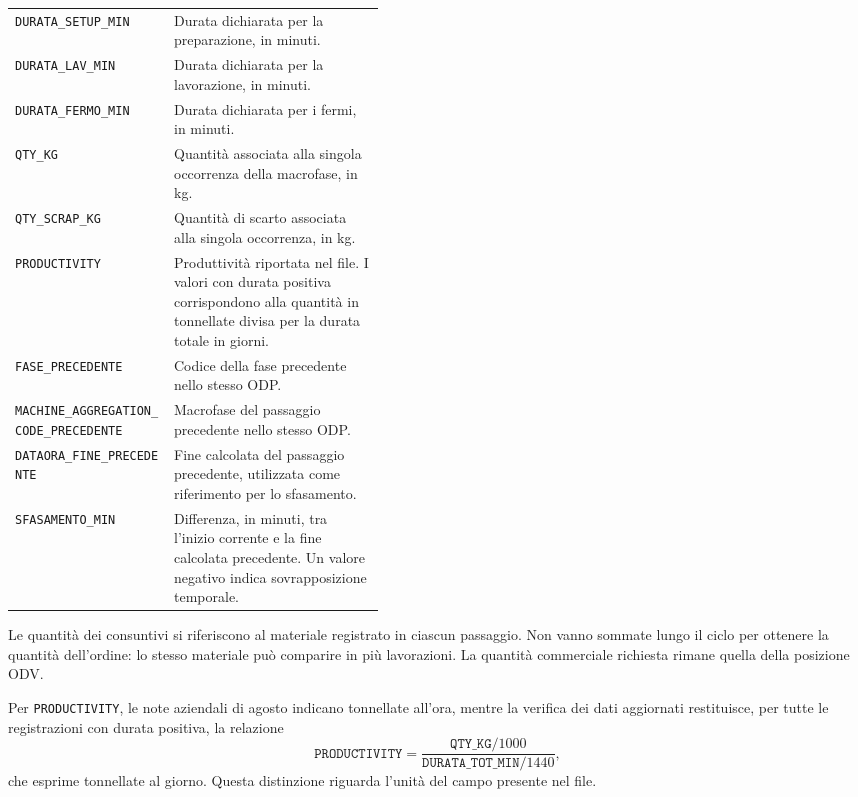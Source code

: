 \begin{longtable}{@{}p{0.43\linewidth}p{}@{}}
\texttt{DURATA\_SETUP\_MIN} & Durata dichiarata per la preparazione, in minuti. \\
\texttt{DURATA\_LAV\_MIN} & Durata dichiarata per la lavorazione, in minuti. \\
\texttt{DURATA\_FERMO\_MIN} & Durata dichiarata per i fermi, in minuti. \\
\texttt{QTY\_KG} & Quantità associata alla singola occorrenza della macrofase, in kg. \\
\texttt{QTY\_SCRAP\_KG} & Quantità di scarto associata alla singola occorrenza, in kg. \\
\texttt{PRODUCTIVITY} & Produttività riportata nel file. I valori con durata positiva corrispondono alla quantità in tonnellate divisa per la durata totale in giorni. \\
\texttt{FASE\_PRECEDENTE} & Codice della fase precedente nello stesso ODP. \\
\texttt{MACHINE\_AGGREGATION\_CODE\_PRECEDENTE} & Macrofase del passaggio precedente nello stesso ODP. \\
\texttt{DATAORA\_FINE\_PRECEDENTE} & Fine calcolata del passaggio precedente, utilizzata come riferimento per lo sfasamento. \\
\texttt{SFASAMENTO\_MIN} & Differenza, in minuti, tra l'inizio corrente e la fine calcolata precedente. Un valore negativo indica sovrapposizione temporale. \\
\end{longtable}
\endgroup

Le quantità dei consuntivi si riferiscono al materiale registrato in ciascun passaggio. Non vanno sommate lungo il ciclo per ottenere la quantità dell'ordine: lo stesso materiale può comparire in più lavorazioni. La quantità commerciale richiesta rimane quella della posizione ODV.

Per \texttt{PRODUCTIVITY}, le note aziendali di agosto indicano tonnellate all'ora, mentre la verifica dei dati aggiornati restituisce, per tutte le registrazioni con durata positiva, la relazione
\[
\texttt{PRODUCTIVITY}
=\frac{\texttt{QTY\_KG}/1000}{\texttt{DURATA\_TOT\_MIN}/1440},
\]
che esprime tonnellate al giorno. Questa distinzione riguarda l'unità del campo presente nel file.

